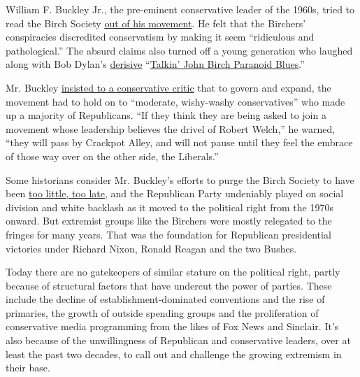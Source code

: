 William F. Buckley Jr., the pre-eminent conservative leader of the
1960s, tried to read the Birch Society
\href{https://www.wsj.com/articles/SB120413132440097025}{out of his
movement}. He felt that the Birchers' conspiracies discredited
conservatism by making it seem ``ridiculous and pathological.'' The
absurd claims also turned off a young generation who laughed along with
Bob Dylan's
\href{http://www.bobdylan.com/songs/talkin-john-birch-paranoid-blues/}{derisive}
``\href{https://www.youtube.com/watch?v=AylFqdxRMwE}{Talkin' John Birch
Paranoid Blues}.''

Mr. Buckley
\href{https://books.google.com/books?id=aBEpI5h9gAUC\&pg=PA200\&lpg=PA200\&dq=john+judis+william+f+buckley+crackpot+alley\&source=bl\&ots=UbBLMVoPGU\&sig=ACfU3U2xd1iiARziNMlQBdps-MQ5TIVxDA\&hl=en\&sa=X\&ved=2ahUKEwiH1qKlpqPrAhWOoHIEHbxSB9oQ6AEwB3oECAoQAQ\#v=onepage\&q=john\%20judis\%20william\%20f\%20buckley\%20crackpot\%20alley\&f=false}{insisted
to a conservative critic} that to govern and expand, the movement had to
hold on to ``moderate, wishy-washy conservatives'' who made up a
majority of Republicans. ``If they think they are being asked to join a
movement whose leadership believes the drivel of Robert Welch,'' he
warned, ``they will pass by Crackpot Alley, and will not pause until
they feel the embrace of those way over on the other side, the
Liberals.''

Some historians consider Mr. Buckley's efforts to purge the Birch
Society to have been
\href{https://www.nytimes3xbfgragh.onion/2019/01/15/opinion/steve-king.html}{too
little, too late}, and the Republican Party undeniably played on social
division and white backlash as it moved to the political right from the
1970s onward. But extremist groups like the Birchers were mostly
relegated to the fringes for many years. That was the foundation for
Republican presidential victories under Richard Nixon, Ronald Reagan and
the two Bushes.

Today there are no gatekeepers of similar stature on the political
right, partly because of structural factors that have undercut the power
of parties. These include the decline of establishment-dominated
conventions and the rise of primaries, the growth of outside spending
groups and the proliferation of conservative media programming from the
likes of Fox News and Sinclair. It's also because of the unwillingness
of Republican and conservative leaders, over at least the past two
decades, to call out and challenge the growing extremism in their base.

